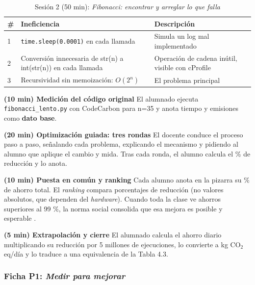 \begin{table}[H]
\centering
\caption{Sesión 2 (50 min): \textit{Fibonacci: encontrar y arreglar lo que falla}}
\label{tab:sesion-2-50-min-fibonacci-encontrar-y-arreglar-lo-}

\begin{tabularx}{\textwidth}{|X|X|X|}
\hline
\textbf{\#} & \textbf{Ineficiencia} & \textbf{Descripción} \\
\hline
1 & \texttt{time.sleep(0.0001)} en cada llamada & Simula un log mal implementado \\
\hline
2 & Conversión innecesaria de str(n) a int(str(n)) en cada llamada & Operación de cadena inútil, visible con cProfile \\
\hline
3 & Recursividad sin memoización: $O(2^n)$ & El problema principal \\
\hline
\end{tabularx}

\end{table}


\textbf{(10 min) Medición del código original} El alumnado ejecuta \texttt{fibonacci\_lento.py} con CodeCarbon para n=35 y anota tiempo y emisiones como \textbf{dato base}.


\textbf{(20 min) Optimización guiada: tres rondas} El docente conduce el proceso paso a paso, señalando cada problema, explicando el mecanismo y pidiendo al alumno que aplique el cambio y mida. Tras cada ronda, el alumno calcula el \% de reducción y lo anota.


\textbf{(10 min) Puesta en común y ranking} Cada alumno anota en la pizarra su \% de ahorro total. El \textit{ranking} compara porcentajes de reducción (no valores absolutos, que dependen del \textit{hardware}). Cuando toda la clase ve ahorros superiores al 99 \%, la norma social consolida que esa mejora es posible y esperable \cite{cialdini2001influence}.


\textbf{(5 min) Extrapolación y cierre} El alumnado calcula el ahorro diario multiplicando su reducción por 5 millones de ejecuciones, lo convierte a kg CO$_2$eq/día y lo traduce a una equivalencia de la Tabla 4.3.




\subsubsection{Ficha P1: \textit{Medir para mejorar}}



